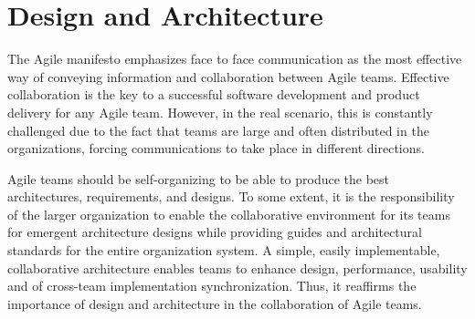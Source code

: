 \documentclass[sigplan,screen]{acmart}
\begin{document}
\section{Design and Architecture}
The Agile manifesto emphasizes face to face communication as the most effective way of conveying information and collaboration between Agile teams. Effective collaboration is the key to a successful software development and product delivery for any Agile team. However, in the real scenario, this is constantly challenged due to the fact that teams are large and often distributed in the organizations, forcing communications to take place in different directions.
\par
Agile teams should be self-organizing to be able to produce the best architectures, requirements, and designs. To some extent, it is the responsibility of the larger organization to enable the collaborative environment for its teams for emergent architecture designs while providing guides and architectural standards for the entire organization system. A simple, easily implementable, collaborative architecture enables teams to enhance design, performance, usability and of cross-team implementation synchronization. Thus, it reaffirms the importance of design and architecture in the collaboration of Agile teams.
\end{document}
